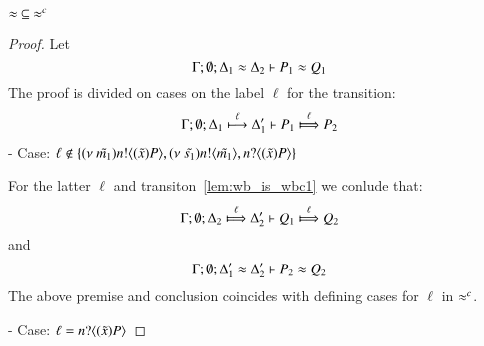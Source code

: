 
\begin{lemma}\rm
	\label{lem:wb_is_wbc}
	$\approx\ \subseteq\ \approx^{c}$
\end{lemma}

\begin{proof}
	Let
	\[
		\Gamma; \emptyset; \Delta_1 \approx \Delta_2 \vdash P_1 \approx Q_1
	\]
	The proof is divided on cases on the label $\ell$ for the transition:
%
	\begin{eqnarray}
		\Gamma; \es; \Delta_1 \hby{\ell} \Delta_1' \proves P_1 \Hby{\ell} P_2 \label{lem:wb_is_wbc1}
	\end{eqnarray}
%
	\noi - Case: $\ell \notin \{ (\nu\ \tilde{m_1}) n ! \langle (\tilde{x}) P \rangle,  (\nu\ \tilde{s_1}) n ! \langle \tilde{m_1} \rangle, n ? \langle (\tilde{x}) P \rangle \}$

	\noi For the latter $\ell$ and transiton~\ref{lem:wb_is_wbc1} we conlude that:	
%
	\[
		\Gamma; \es; \Delta_2 \Hby{\ell} \Delta_2' \proves Q_1 \Hby{\ell} Q_2
	\]
%
	\noi and
%
	\[
		\Gamma; \emptyset; \Delta_1' \approx \Delta_2' \vdash P_2 \approx Q_2
	\]
%
	The above premise and conclusion coincides with defining cases for $\ell$ in $\approx^{c}$.

	\noi - Case: $\ell = n ? \langle (\tilde{x}) P \rangle$


\end{proof}

